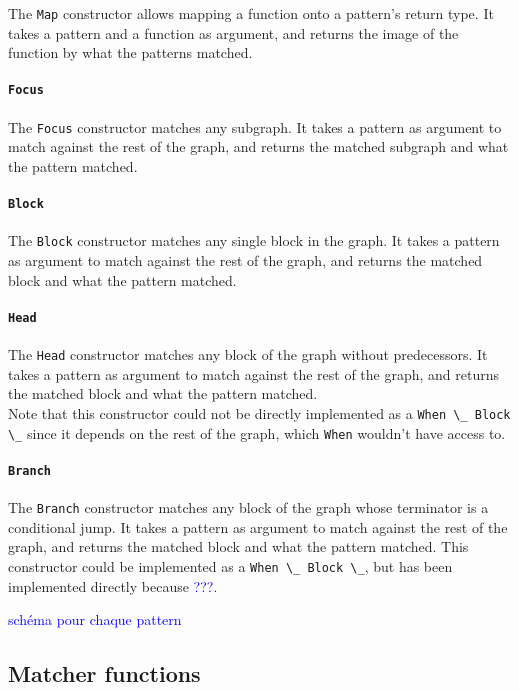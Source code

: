 \documentclass[11pt]{article}
\newcommand{\inlinecoq}[1]{\mbox{\lstinline[style=customcoq,columns=fixed,basewidth=.48em]{#1}}}
\newcommand{\ilc}[1]{\inlinecoq{#1}}
\newcommand{\leon}[1]{\textcolor{blue}{#1}}
\begin{document}
The \ilc{Map} constructor allows mapping a function onto a pattern's return type.
It takes a pattern and a function as argument, and returns the image of the function by what the patterns matched.

\paragraph{\ilc{Focus}}

The \ilc{Focus} constructor matches any subgraph.
It takes a pattern as argument to match against the rest of the graph, and returns the matched subgraph and what the pattern matched.

\paragraph{\ilc{Block}}

The \ilc{Block} constructor matches any single block in the graph.
It takes a pattern as argument to match against the rest of the graph, and returns the matched block and what the pattern matched.

\paragraph{\ilc{Head}}

The \ilc{Head} constructor matches any block of the graph without predecessors.
It takes a pattern as argument to match against the rest of the graph, and returns the matched block and what the pattern matched.\\
Note that this constructor could not be directly implemented as a \ilc{When \_ Block \_} since it depends on the rest of the graph, which \ilc{When} wouldn't have access to.

\paragraph{\ilc{Branch}}

The \ilc{Branch} constructor matches any block of the graph whose terminator is a conditional jump.
It takes a pattern as argument to match against the rest of the graph, and returns the matched block and what the pattern matched.
This constructor could be implemented as a \ilc{When \_ Block \_}, but has been implemented directly because \leon{???}.

\leon{schéma pour chaque pattern}

\subsection{Matcher functions}
\end{document}
